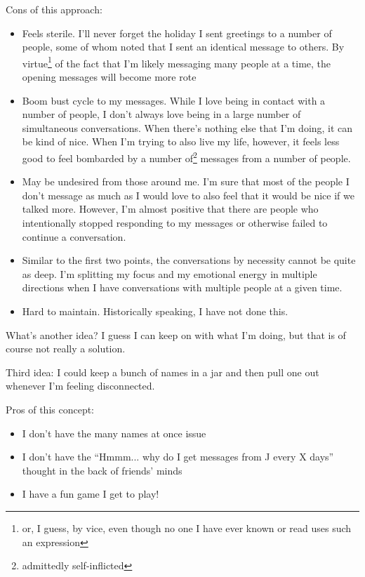 \documentclass[12pt]{article}
\newcommand{\say}[1]{``#1''}
\renewcommand{\,}{\textsuperscript{,}}
\begin{document}
Cons of this approach:  
\begin{itemize}  
\item Feels sterile. I'll never forget the holiday I sent greetings to a number of people, some of whom noted that I sent an identical message to others. By virtue\footnote{or, I guess, by vice, even though no one I have ever known or read uses such an expression} of the fact that I'm likely messaging many people at a time, the opening messages will become more rote  
\item Boom bust cycle to my messages. While I love being in contact with a number of people, I don't always love being in a large number of simultaneous conversations. When there's nothing else that I'm doing, it can be kind of nice.  
When I'm trying to also live my life, however, it feels less good to feel bombarded by a number of\footnote{admittedly self-inflicted} messages from a number of people.  
\item May be undesired from those around me. I'm sure that most of the people I don't message as much as I would love to also feel that it would be nice if we talked more. However, I'm almost positive that there are people who intentionally stopped responding to my messages or otherwise failed to continue a conversation.  
\item Similar to the first two points, the conversations by necessity cannot be quite as deep. I'm splitting my focus and my emotional energy in multiple directions when I have conversations with multiple people at a given time.  
\item Hard to maintain. Historically speaking, I have not done this.  
\end{itemize}

What's another idea?  
I guess I can keep on with what I'm doing, but that is of course not really a solution.

Third idea: I could keep a bunch of names in a jar and then pull one out whenever I'm feeling disconnected.

Pros of this concept:

\begin{itemize}  
\item I don't have the many names at once issue  
\item I don't have the \say{Hmmm... why do I get messages from J every X days} thought in the back of friends' minds  
\item I have a fun game I get to play!  
\end{itemize}
\end{document}
